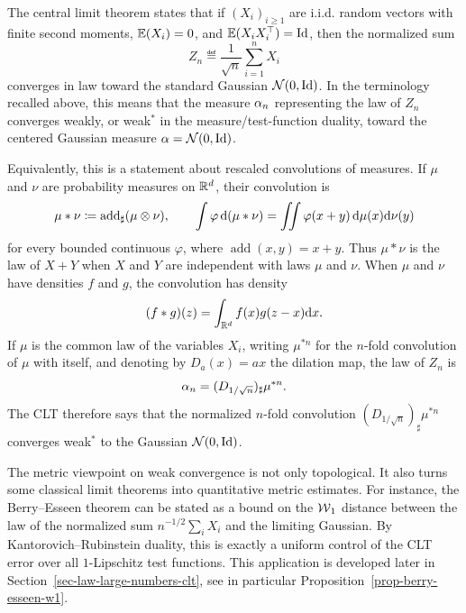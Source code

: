 \begin{rem}\label{rem-clt}
	The central limit theorem states that if $(X_i)_{i\geq1}$ are i.i.d. random vectors with finite second moments, $\mathbb{E}(X_i)=0$, and $\mathbb{E}(X_i X_i^\top)=\mathrm{Id}$, then the normalized sum
	\[
		Z_n \eqdef \frac{1}{\sqrt{n}} \sum_{i=1}^n X_i
	\]
	converges in law toward the standard Gaussian $\mathcal{N}(0,\mathrm{Id})$. In the terminology recalled above, this means that the measure $\alpha_n$ representing the law of $Z_n$ converges weakly, or weak$^*$ in the measure/test-function duality, toward the centered Gaussian measure $\alpha=\mathcal{N}(0,\mathrm{Id})$.

	Equivalently, this is a statement about rescaled convolutions of measures. If $\mu$ and $\nu$ are probability measures on $\mathbb{R}^d$, their convolution is
	\[
		\mu*\nu \coloneqq \operatorname{add}_\sharp(\mu\otimes\nu),
		\qquad
		\int \varphi\,\mathrm{d}(\mu*\nu)
		=
		\iint \varphi(x+y)\,\mathrm{d}\mu(x)\mathrm{d}\nu(y)
	\]
	for every bounded continuous $\varphi$, where $\operatorname{add}(x,y)=x+y$. Thus $\mu*\nu$ is the law of $X+Y$ when $X$ and $Y$ are independent with laws $\mu$ and $\nu$. When $\mu$ and $\nu$ have densities $f$ and $g$, the convolution has density
	\[
		(f*g)(z)=\int_{\mathbb{R}^d} f(x)g(z-x)\mathrm{d} x.
	\]
	If $\mu$ is the common law of the variables $X_i$, writing $\mu^{*n}$ for the $n$-fold convolution of $\mu$ with itself, and denoting by $D_a(x)=a x$ the dilation map, the law of $Z_n$ is
	\[
		\alpha_n=(D_{1/\sqrt n})_\sharp\mu^{*n}.
	\]
	The CLT therefore says that the normalized $n$-fold convolution $(D_{1/\sqrt n})_\sharp\mu^{*n}$ converges weak$^*$ to the Gaussian $\mathcal{N}(0,\mathrm{Id})$.
\end{rem}

\begin{rem}\label{rem-wasserstein-berry-esseen-pointer}
	The metric viewpoint on weak convergence is not only topological.  It also turns some classical limit theorems into quantitative metric estimates.  For instance, the Berry--Esseen theorem can be stated as a bound on the \(\operatorname{\mathcal{W}}_1\) distance between the law of the normalized sum \(n^{-1/2}\sum_i X_i\) and the limiting Gaussian.  By Kantorovich--Rubinstein duality, this is exactly a uniform control of the CLT error over all \(1\)-Lipschitz test functions.  This application is developed later in Section~\ref{sec-law-large-numbers-clt}, see in particular Proposition~\ref{prop-berry-esseen-w1}.
\end{rem}

